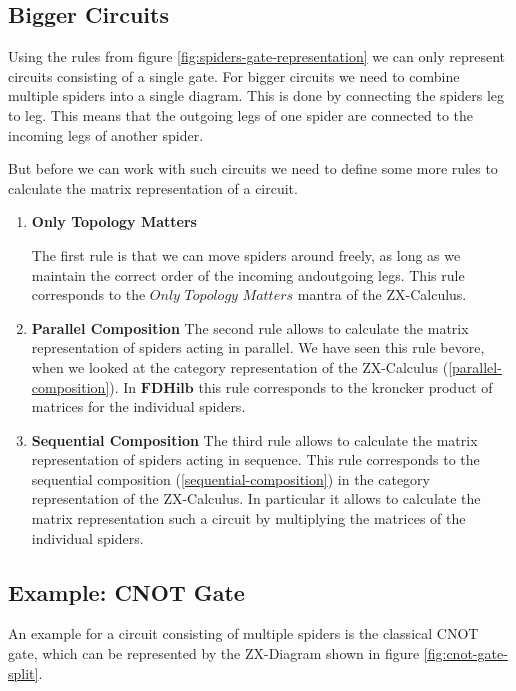 \subsection{Bigger Circuits}

Using the rules from figure \ref{fig:spiders-gate-representation} we can only represent circuits consisting of a single gate. For bigger circuits we need to combine multiple spiders into a single diagram. This is done by connecting the spiders leg to leg. This means that the outgoing legs of one spider are connected to the incoming legs of another spider.

But before we can work with such circuits we need to define some more rules to calculate the matrix representation of a circuit.

\begin{enumerate}

    \item \textbf{Only Topology Matters}

          The first rule is that we can move spiders around freely, as long as we maintain the correct order of the incoming andoutgoing legs. This rule corresponds to the $\textit{Only Topology Matters}$ mantra of the ZX-Calculus.

    \item \textbf{Parallel Composition}
          The second rule allows to calculate the matrix representation of spiders acting in parallel. We have seen this rule bevore, when we looked at the category representation of the ZX-Calculus (\ref{parallel-composition}). In $\mathbf{FDHilb}$ this rule corresponds to the kroncker product of matrices for the individual spiders.

    \item \textbf{Sequential Composition}
          The third rule allows to calculate the matrix representation of spiders acting in sequence. This rule corresponds to the sequential composition (\ref{sequential-composition}) in the category representation of the ZX-Calculus. In particular it allows to calculate the matrix representation such a circuit by multiplying the matrices of the individual spiders.
\end{enumerate}

\subsection{Example: CNOT Gate}

An example for a circuit consisting of multiple spiders is the classical CNOT gate, which can be represented by the ZX-Diagram shown in figure \ref{fig:cnot-gate-split}.

